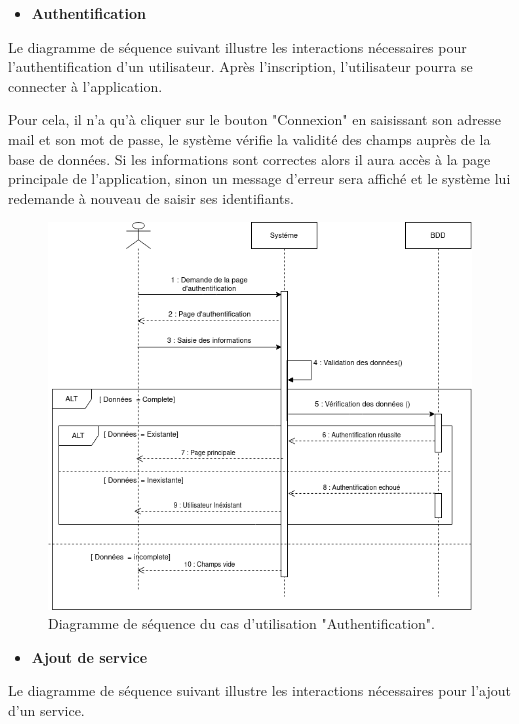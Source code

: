 \documentclass[french]{report}
\begin{document}
\begin{itemize}
\item \textbf{Authentification} 
\end{itemize}
	Le diagramme de séquence suivant illustre les interactions nécessaires pour 
	l'authentification d'un utilisateur. Après l'inscription, l'utilisateur pourra 
	se connecter à l'application. 
	
	Pour cela, il n'a qu'à cliquer sur le bouton "Connexion" en saisissant 
	son adresse mail et son mot de passe, le système vérifie la validité des 
	champs auprès de la base de données. Si les informations sont correctes alors 
	il aura accès à la page principale de l'application, sinon un message d'erreur
	sera affiché et le système lui redemande à nouveau de saisir ses identifiants.
	
        \begin{figure}[H]
            \centering
            \includegraphics[width=1\textwidth]{images/Connexion Seq Diagram.drawio.png}
            \caption{Diagramme de séquence du cas d'utilisation "Authentification".}
            \label{fig:my_label}
        \end{figure}
        
\begin{itemize}
\item  \textbf{Ajout de service}
\end{itemize}
	Le diagramme de séquence suivant illustre les interactions nécessaires pour l'ajout d'un service. 
	
\end{document}
